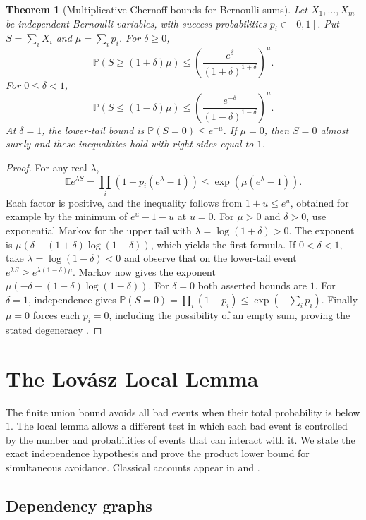 \documentclass[11pt,oneside,openany]{book}
\theoremstyle{plain}
\newtheorem{theorem}{Theorem}[chapter]
\theoremstyle{definition}
\theoremstyle{remark}
\begin{document}
\pagebreak
\begin{theorem}[Multiplicative Chernoff bounds for Bernoulli sums]
\label{p205:W26}
Let \(X_1,\ldots,X_m\) be independent Bernoulli variables,
with success probabilities \(p_i\in[0,1]\). Put
\(S=\sum_i X_i\) and \(\mu=\sum_i p_i\). For \(\delta\ge0\),
\[
 \mathbb P(S\ge (1+\delta)\mu)
 \le\left(\frac{e^\delta}{(1+\delta)^{1+\delta}}\right)^\mu .
\]
For \(0\le\delta<1\),
\[
 \mathbb P(S\le (1-\delta)\mu)
 \le\left(\frac{e^{-\delta}}{(1-\delta)^{1-\delta}}\right)^\mu .
\]
At \(\delta=1\), the lower-tail bound is
\(\mathbb P(S=0)\le e^{-\mu}\).
If \(\mu=0\), then \(S=0\) almost surely and these
inequalities hold with right sides equal to \(1\).
\end{theorem}

\begin{proof}
For any real \(\lambda\),
\[
 \mathbb E e^{\lambda S}
  =\prod_i(1+p_i(e^\lambda-1))
  \le \exp(\mu(e^\lambda-1)).
\]
Each factor is positive, and the inequality follows from
\(1+u\le e^u\), obtained for example by the minimum of
\(e^u-1-u\) at \(u=0\). For \(\mu>0\) and \(\delta>0\),
use exponential Markov for the upper tail with
\(\lambda=\log(1+\delta)>0\). The exponent is
\(\mu(\delta-(1+\delta)\log(1+\delta))\), which yields the
first formula. If \(0<\delta<1\), take
\(\lambda=\log(1-\delta)<0\) and observe that on the
lower-tail event \(e^{\lambda S}\ge
e^{\lambda(1-\delta)\mu}\). Markov now gives the exponent
\(\mu(-\delta-(1-\delta)\log(1-\delta))\).
For \(\delta=0\) both asserted bounds are \(1\).
For \(\delta=1\), independence gives
\(\mathbb P(S=0)=\prod_i(1-p_i)\le\exp(-\sum_i p_i)\).
Finally \(\mu=0\) forces each \(p_i=0\), including the
possibility of an empty sum, proving the stated degeneracy
\cite{alon}.
\end{proof}
\chapter{The Lov\'asz Local Lemma}
\label{p205:local-lemma}

The finite union bound avoids all bad events when their total probability
is below \(1\). The local lemma allows a different test in which each
bad event is controlled by the number and probabilities of events
that can interact with it. We state the exact independence hypothesis
and prove the product lower bound for simultaneous avoidance.
Classical accounts appear in \cite[Section~5.1]{alon} and
\cite[Sections~2.2--2.3]{vondrak}.

\section{Dependency graphs}
\end{document}
